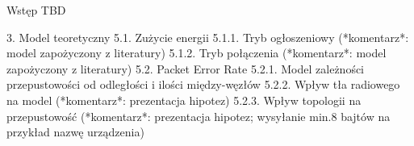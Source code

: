 Wstęp TBD

3. Model teoretyczny
 5.1. Zużycie energii 
  5.1.1. Tryb ogłoszeniowy (*komentarz*: model zapożyczony z literatury)
  5.1.2. Tryb połączenia (*komentarz*: model zapożyczony z literatury)
 5.2. Packet Error Rate
  5.2.1. Model zależności przepustowości od odległości i ilości między-węzłów
  5.2.2. Wpływ tła radiowego na model (*komentarz*: prezentacja hipotez)
  5.2.3. Wpływ topologii na przepustowość (*komentarz*: prezentacja hipotez; wysyłanie min.8 bajtów na przykład nazwę urządzenia)
